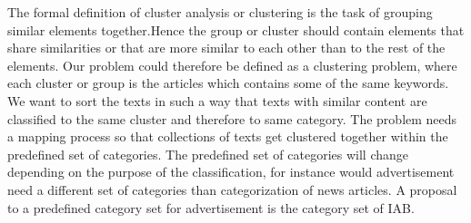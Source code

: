 The formal definition of cluster analysis or clustering is the task of grouping similar elements together.Hence the group or cluster should contain elements that share similarities or that are more similar to each other than to the rest of the elements. %
Our problem could therefore be defined as a clustering problem, where each cluster or group is the articles which contains some of the same keywords. We want to sort the texts in such a way that texts with similar content are classified to the same cluster and therefore to same category. The problem needs a mapping process so that collections of texts get clustered together within the predefined set of categories. The predefined set of categories will change depending on the purpose of the classification, for instance would advertisement need a different set of categories than categorization of news articles. A proposal to a predefined category set for advertisement is the category set of IAB. 